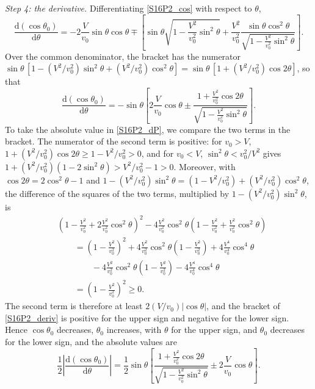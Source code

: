 \begin{problem}[title={Lab angular distribution of decay products}]
{\textit{Step 4: the derivative.} Differentiating \eqref{S16P2_cos} with respect to $\theta$,
\begin{equation*}
    \frac{\mathrm{d}(\cos{\theta_0})}{\mathrm{d}\theta} = -2\frac{V}{v_0}\sin{\theta}\cos{\theta} \mp \left[\sin{\theta}\sqrt{1-\frac{V^2}{v_0^2}\sin^2{\theta}} + \frac{V^2}{v_0^2}\frac{\sin{\theta}\cos^2{\theta}}{\sqrt{1-\frac{V^2}{v_0^2}\sin^2{\theta}}}\right].
\end{equation*}
Over the common denominator, the bracket has the numerator $\sin{\theta}\,[1-(V^2/v_0^2)\sin^2{\theta}+(V^2/v_0^2)\cos^2{\theta}] = \sin{\theta}\,[1+(V^2/v_0^2)\cos{2\theta}]$, so that
\begin{equation}
    \frac{\mathrm{d}(\cos{\theta_0})}{\mathrm{d}\theta} = -\sin{\theta}\left[2\frac{V}{v_0}\cos{\theta} \pm \frac{1+\frac{V^2}{v_0^2}\cos{2\theta}}{\sqrt{1-\frac{V^2}{v_0^2}\sin^2{\theta}}}\right]. \label{S16P2_deriv}
\end{equation}
To take the absolute value in \eqref{S16P2_dP}, we compare the two terms in the bracket. The numerator of the second term is positive: for $v_0>V$, $1+(V^2/v_0^2)\cos{2\theta} \geq 1-V^2/v_0^2 > 0$, and for $v_0<V$, $\sin^2{\theta}<v_0^2/V^2$ gives $1+(V^2/v_0^2)(1-2\sin^2{\theta}) > V^2/v_0^2-1 > 0$. Moreover, with $\cos{2\theta} = 2\cos^2{\theta}-1$ and $1-(V^2/v_0^2)\sin^2{\theta} = (1-V^2/v_0^2) + (V^2/v_0^2)\cos^2{\theta}$, the difference of the squares of the two terms, multiplied by $1-(V^2/v_0^2)\sin^2{\theta}$, is
\begin{align*}
    &\left(1-\frac{V^2}{v_0^2}+2\frac{V^2}{v_0^2}\cos^2{\theta}\right)^2 - 4\frac{V^2}{v_0^2}\cos^2{\theta}\left(1-\frac{V^2}{v_0^2}+\frac{V^2}{v_0^2}\cos^2{\theta}\right) \\
    &\qquad = \left(1-\frac{V^2}{v_0^2}\right)^2 + 4\frac{V^2}{v_0^2}\cos^2{\theta}\left(1-\frac{V^2}{v_0^2}\right) + 4\frac{V^4}{v_0^4}\cos^4{\theta} \\
    &\qquad\qquad - 4\frac{V^2}{v_0^2}\cos^2{\theta}\left(1-\frac{V^2}{v_0^2}\right) - 4\frac{V^4}{v_0^4}\cos^4{\theta} \\
    &\qquad = \left(1-\frac{V^2}{v_0^2}\right)^2 \geq 0.
\end{align*}
The second term is therefore at least $2(V/v_0)|\cos{\theta}|$, and the bracket of \eqref{S16P2_deriv} is positive for the upper sign and negative for the lower sign. Hence $\cos{\theta_0}$ decreases, \ie $\theta_0$ increases, with $\theta$ for the upper sign, and $\theta_0$ decreases for the lower sign, and the absolute values are
\begin{equation*}
    \frac{1}{2}\left|\frac{\mathrm{d}(\cos{\theta_0})}{\mathrm{d}\theta}\right| = \frac{1}{2}\sin{\theta}\left[\frac{1+\frac{V^2}{v_0^2}\cos{2\theta}}{\sqrt{1-\frac{V^2}{v_0^2}\sin^2{\theta}}} \pm 2\frac{V}{v_0}\cos{\theta}\right].
\end{equation*}

}
\end{problem}
